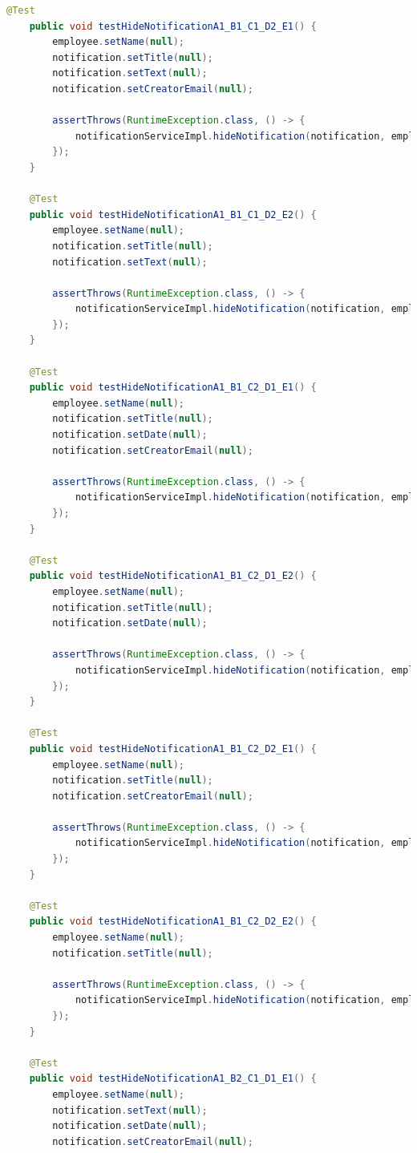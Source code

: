 \begin{lstlisting}[language=java]
    @Test
    public void testHideNotificationA1_B1_C1_D2_E1() {
        employee.setName(null);
        notification.setTitle(null);
        notification.setText(null);
        notification.setCreatorEmail(null);

        assertThrows(RuntimeException.class, () -> {
            notificationServiceImpl.hideNotification(notification, employee);
        });
    }

    @Test
    public void testHideNotificationA1_B1_C1_D2_E2() {
        employee.setName(null);
        notification.setTitle(null);
        notification.setText(null);

        assertThrows(RuntimeException.class, () -> {
            notificationServiceImpl.hideNotification(notification, employee);
        });
    }

    @Test
    public void testHideNotificationA1_B1_C2_D1_E1() {
        employee.setName(null);
        notification.setTitle(null);
        notification.setDate(null);
        notification.setCreatorEmail(null);

        assertThrows(RuntimeException.class, () -> {
            notificationServiceImpl.hideNotification(notification, employee);
        });
    }

    @Test
    public void testHideNotificationA1_B1_C2_D1_E2() {
        employee.setName(null);
        notification.setTitle(null);
        notification.setDate(null);

        assertThrows(RuntimeException.class, () -> {
            notificationServiceImpl.hideNotification(notification, employee);
        });
    }

    @Test
    public void testHideNotificationA1_B1_C2_D2_E1() {
        employee.setName(null);
        notification.setTitle(null);
        notification.setCreatorEmail(null);

        assertThrows(RuntimeException.class, () -> {
            notificationServiceImpl.hideNotification(notification, employee);
        });
    }

    @Test
    public void testHideNotificationA1_B1_C2_D2_E2() {
        employee.setName(null);
        notification.setTitle(null);

        assertThrows(RuntimeException.class, () -> {
            notificationServiceImpl.hideNotification(notification, employee);
        });
    }

    @Test
    public void testHideNotificationA1_B2_C1_D1_E1() {
        employee.setName(null);
        notification.setText(null);
        notification.setDate(null);
        notification.setCreatorEmail(null);


\end{lstlisting}

